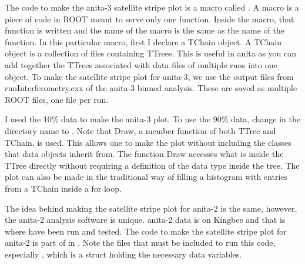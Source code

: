 The code to make the \gls{anita}-3 satellite stripe plot is a macro called . A macro is a piece of code in ROOT meant to serve only one function. Inside the macro, that function is written and the name of the macro is the same as the name of the function. 
In this particular macro, first I declare a TChain object. A TChain object is a collection of files containing TTrees. This is useful in \gls{anita} as you can add together the TTrees associated with data files of multiple runs into one object. To make the satellite stripe plot for \gls{anita}-3, we use the output files from runInterferometry.cxx of the \gls{anita}-3 binned analysis. These are saved as multiple ROOT files, one file per run. 

I used the 10\% data to make the \gls{anita}-3 plot. To use the 90\% data, change  in the directory name to . Note that Draw, a member function of both TTree and TChain, is used. This allows one to make the plot without including the classes that data objects inherit from. The function Draw accesses what is inside the TTree directly without requiring a definition of the data type inside the tree. The plot can also be made in the traditional way of filling a histogram with entries from a TChain inside a for loop. 

The idea behind making the satellite stripe plot for \gls{anita}-2 is the same, however, the \gls{anita}-2 analysis software is unique. 
\gls{anita}-2 data is on Kingbee and that is where  have been run and tested. The code to make the satellite stripe plot for \gls{anita}-2 is part of  in . Note the  files that must be included to run this code, especially , which is a struct holding the necessary data variables. 


